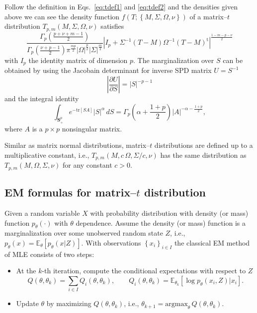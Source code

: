 \documentclass[english,listof=totoc]{scrartcl}
\begin{document}
Follow the definition in Eqs.~\eqref{eq:tdef1} and \eqref{eq:tdef2} and the densities given above we can see the density function $f(T;\left\{M,\Sigma,\Omega,\nu\right\})$ of a matrix--$t$ distribution $T_{p,m}(M,\Sigma,\Omega,\nu)$ satisfies
\begin{equation}
\frac{\Gamma_{p}\left(\frac{p+\nu+m-1}{2}\right)}{\Gamma_{p}\left(\frac{\nu+p-1}{2}\right)\pi^{\frac{mp}{2}}|\Omega|^{\frac{p}{2}}|\Sigma|^{\frac{m}{2}}}
|I_p+\Sigma^{-1}(T-M)\Omega^{-1}(T-M)^{\textrm{t}}|^{\frac{1-m-p-\nu}{2}}
\label{eq:matrixtpdf}
\end{equation}
with $I_p$ the identity matrix of dimension $p$. The marginalization over $S$ can be obtained by using the Jacobain determinant for inverse SPD matrix $U=S^{-1}$
\begin{equation}
\left|\frac{\partial U}{\partial S}\right|=|S|^{-p-1}
\end{equation}
and the integral identity \citep{gupta1999matrix}
\begin{equation}
\int_{\mathbf{S}_+^p}e^{-\textrm{tr}[S A]}|S|^{\alpha}\,dS=\Gamma_{p}\left(\alpha+\frac{1+p}{2}\right)|A|^{-\alpha-\frac{1+p}{2}},\label{eq:intmultgammadef}
\end{equation}
where $A$ is a $p\times p$ nonsingular matrix.

Similar as matrix normal distributions, matrix--$t$ distributions are defined up to a multiplicative constant, i.e., $T_{p,m}(M,c\,\Omega,\Sigma/c,\nu)$ has the same distribution as $T_{p,m}(M,\Omega,\Sigma,\nu)$ for any constant $c>0$.

\subsection{EM formulas for matrix--$t$ distribution}

Given a random variable $X$ with probability distribution with density (or mass) function $p_{\theta}(\cdot)$ with $\theta$ dependence. Assume the density (or mass) function is a marginalization over some unobserved random state $Z$, i.e., $p_{\theta}(x)=\mathbb{E}_{\theta}\left[p_{\theta}(x|Z)\right]$. With observations $\left\{x_i\right\}_{i\in I}$ the classical EM method of MLE consists of two steps:

\begin{itemize}
\item At the $k$-th iteration, compute the conditional expectations with respect to $Z$
\begin{equation}
Q(\theta,\theta_k)=\sum_{i\in I}Q_i(\theta,\theta_k),\qquad Q_i(\theta,\theta_k)=\mathbb{E}_{\theta_k}\left[\log p_{\theta}(x_i,Z)|x_i\right].
\end{equation}

\item Update $\theta$ by maximizing $Q(\theta,\theta_k)$, i.e., $\theta_{k+1} = \textrm{argmax}_{\theta}\,Q(\theta,\theta_k)$.
\end{itemize}
\end{document}
